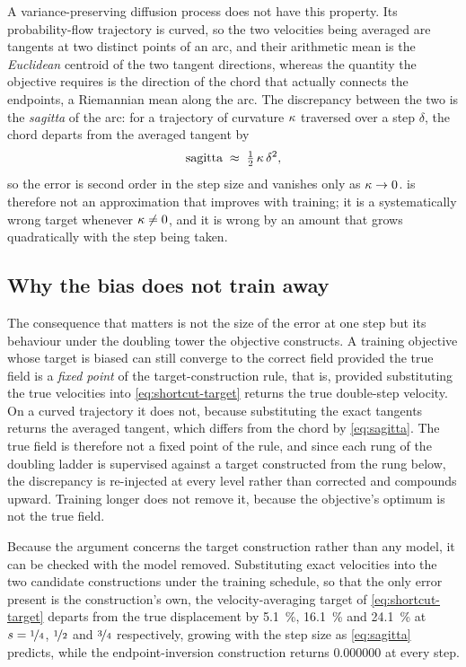 A variance-preserving diffusion process does not have this property. Its
probability-flow trajectory is curved, so the two velocities being averaged
are tangents at two distinct points of an arc, and their arithmetic mean is
the \emph{Euclidean} centroid of the two tangent directions, whereas the
quantity the objective requires is the direction of the chord that actually
connects the endpoints, a Riemannian mean along the arc. The discrepancy
between the two is the \emph{sagitta} of the arc: for a trajectory of
curvature $\kappa$ traversed over a step $\delta$, the chord departs from
the averaged tangent by
\begin{equation}
  \label{eq:sagitta}
  \text{sagitta} \;\approx\; \tfrac{1}{2}\,\kappa\,\delta^{2},
\end{equation}
so the error is second order in the step size and vanishes only as
$\kappa \to 0$.  is therefore not an approximation
that improves with training; it is a systematically wrong target whenever
$\kappa \neq 0$, and it is wrong by an amount that grows quadratically with
the step being taken.

\subsection{Why the bias does not train away}

The consequence that matters is not the size of the error at one step but
its behaviour under the doubling tower the objective constructs. A training
objective whose target is biased can still converge to the correct field
provided the true field is a \emph{fixed point} of the target-construction
rule, that is, provided substituting the true velocities into
\cref{eq:shortcut-target} returns the true double-step velocity. On a
curved trajectory it does not, because substituting the exact tangents
returns the averaged tangent, which differs from the chord by
\cref{eq:sagitta}. The true field is therefore not a fixed point of the
rule, and since each rung of the doubling ladder is supervised against a
target constructed from the rung below, the discrepancy is re-injected at
every level rather than corrected and compounds upward. Training longer
does not remove it, because the objective's optimum is not the true field.

Because the argument concerns the target construction rather than any
model, it can be checked with the model removed. Substituting exact
velocities into the two candidate constructions under the training
schedule, so that the only error present is the construction's own, the
velocity-averaging target of \cref{eq:shortcut-target} departs from the
true displacement by \SI{5.1}{\percent}, \SI{16.1}{\percent} and
\SI{24.1}{\percent} at $s = \nicefrac{1}{4}$, $\nicefrac{1}{2}$ and
$\nicefrac{3}{4}$ respectively, growing with the step size as
\cref{eq:sagitta} predicts, while the endpoint-inversion construction
returns $0.000000$ at every step.

